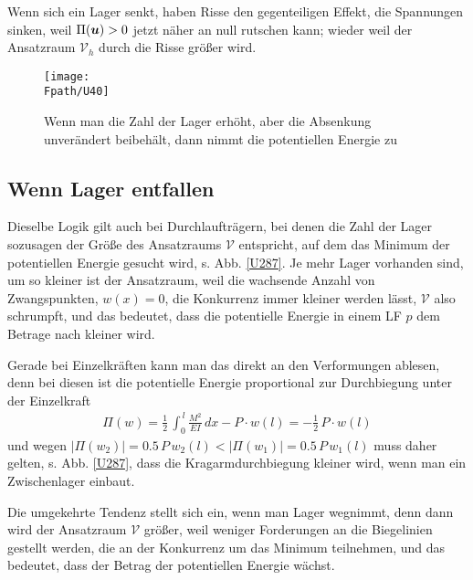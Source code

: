 {{{{{Wenn sich ein Lager senkt, haben Risse den gegenteiligen Effekt, die Spannungen sinken, weil $\Pi(\mbox{\boldmath $u$}) > 0$ jetzt n\"{a}her an null rutschen kann; wieder weil der Ansatzraum $\mathcal{V}_h$ durch die Risse gr\"{o}{\ss}er wird.
\begin{figure}[tbp]
\centering
\if {} \sidecaption \fi
\texttt{[image: \\Fpath/U40]}
\caption{Wenn man die Zahl der Lager erh\"{o}ht, aber die Absenkung unver\"{a}ndert beibeh\"{a}lt, dann nimmt die potentiellen Energie zu}
\label{U40}
\end{figure}%

{\textcolor{sectionTitleBlue}{\subsection{Wenn Lager entfallen}}}
Dieselbe Logik gilt auch bei Durchlauftr\"{a}gern, bei denen die Zahl der Lager sozusagen der Gr\"{o}{\ss}e des Ansatzraums $\mathcal{V}$ entspricht, auf dem das Minimum der potentiellen Energie gesucht wird, s. Abb. \ref{U287}. Je mehr Lager vorhanden sind, um so kleiner ist der Ansatzraum, weil die wachsende Anzahl von Zwangspunkten, $w(x) = 0$, die Konkurrenz immer kleiner werden l\"{a}sst, $\mathcal{V}$ also schrumpft, und das bedeutet, dass die potentielle Energie in einem LF $p$ dem Betrage nach kleiner wird.

Gerade bei Einzelkr\"{a}ften kann man das direkt an den Verformungen ablesen, denn bei diesen ist die potentielle Energie proportional zur Durchbiegung unter der Einzelkraft
\begin{align}
\Pi(w) = \frac{1}{2}\,\int_0^{\,l} \frac{M^2}{EI}\,dx - P\cdot w(l) = - \frac{1}{2}\, P \cdot w(l)
\end{align}
und wegen $|\Pi(w_2)| = 0.5 \,P\,w_2(l) < |\Pi(w_1)| = 0.5 \,P\,w_1(l)$ muss daher gelten, s. Abb. \ref{U287}, dass die Kragarmdurchbiegung kleiner wird, wenn man ein Zwischenlager einbaut.

Die umgekehrte Tendenz stellt sich ein, wenn man Lager wegnimmt, denn dann wird der Ansatzraum $\mathcal{V}$ gr\"{o}{\ss}er, weil weniger Forderungen an die Biegelinien gestellt werden, die an der Konkurrenz um das Minimum teilnehmen, und das bedeutet, dass der Betrag der potentiellen Energie w\"{a}chst.

}}}}}
